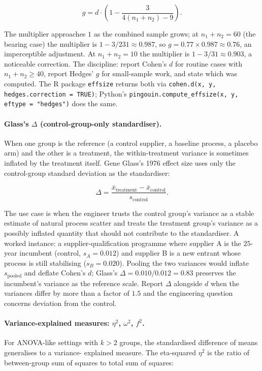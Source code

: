 \[
g = d \cdot \left(1 - \frac{3}{4(n_{1} + n_{2}) - 9}\right).
\]

The multiplier approaches $1$ as the combined sample grows; at
$n_{1} + n_{2} = 60$ (the bearing case) the multiplier is $1 -
3/231 \approx 0.987$, so $g = 0.77 \times 0.987 \approx 0.76$, an
imperceptible adjustment. At $n_{1} + n_{2} = 10$ the multiplier is
$1 - 3/31 \approx 0.903$, a noticeable correction. The discipline:
report Cohen's $d$ for routine cases with $n_{1} + n_{2} \geq 40$,
report Hedges' $g$ for small-sample work, and state which was
computed. The R package \texttt{effsize} returns both via
\texttt{cohen.d(x, y, hedges.correction = TRUE)}; Python's
\texttt{pingouin.compute\_effsize(x, y, eftype = "hedges")} does
the same.

\paragraph{Glass's $\Delta$ (control-group-only standardiser).}
When one group is the reference (a control supplier, a baseline
process, a placebo arm) and the other is a treatment, the
within-treatment variance is sometimes inflated by the treatment
itself. Gene Glass's 1976 effect size
\cite{paper:ch08t3b-glass-1976} uses only the control-group
standard deviation as the standardiser:

\[
\Delta = \frac{\bar{x}_{\text{treatment}} - \bar{x}_{\text{control}}}{s_{\text{control}}}.
\]

The use case is when the engineer trusts the control group's
variance as a stable estimate of natural process scatter and treats
the treatment group's variance as a possibly inflated quantity that
should not contribute to the standardiser. A worked instance: a
supplier-qualification programme where supplier A is the
$25$-year incumbent (control, $s_{A} = 0.012$) and supplier B is a
new entrant whose process is still stabilising ($s_{B} = 0.020$).
Pooling the two variances would inflate $s_{\text{pooled}}$ and
deflate Cohen's $d$; Glass's $\Delta = 0.010/0.012 = 0.83$
preserves the incumbent's variance as the reference scale. Report
$\Delta$ alongside $d$ when the variances differ by more than a
factor of $1.5$ and the engineering question concerns deviation
from the control.

\paragraph{Variance-explained measures: $\eta^{2}$, $\omega^{2}$,
$f^{2}$.} For ANOVA-like settings with $k > 2$ groups, the
standardised difference of means generalises to a variance-
explained measure. The eta-squared $\eta^{2}$ is the ratio of
between-group sum of squares to total sum of squares:

